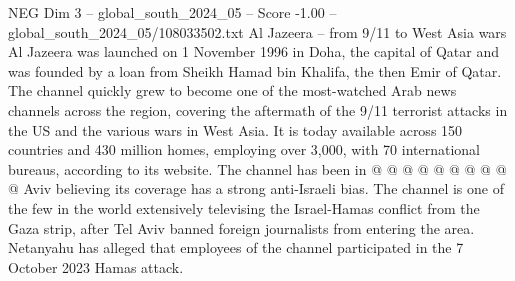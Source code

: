 \begin{textsample}{NEG Dim 3 – global\_south\_2024\_05 – Score -1.00 – global\_south\_2024\_05/108033502.txt}
Al Jazeera -- from 9/11 to West Asia wars Al Jazeera was launched on 1 November 1996 in Doha, the capital of Qatar and was founded by a loan from Sheikh Hamad bin Khalifa, the then Emir of Qatar.
The channel quickly grew to become one of the most-watched Arab news channels across the region, covering the aftermath of the 9/11 terrorist attacks in the US and the various wars in West Asia.
It is today available across 150 countries and 430 million homes, employing over 3,000, with 70 international bureaus, according to its website.
The channel has been in @ @ @ @ @ @ @ @ @ @ Aviv believing its coverage has a strong anti-Israeli bias.
The channel is one of the few in the world extensively televising the Israel-Hamas conflict from the Gaza strip, after Tel Aviv banned foreign journalists from entering the area.
Netanyahu has alleged that employees of the channel participated in the 7 October 2023 Hamas attack.

\end{textsample}
